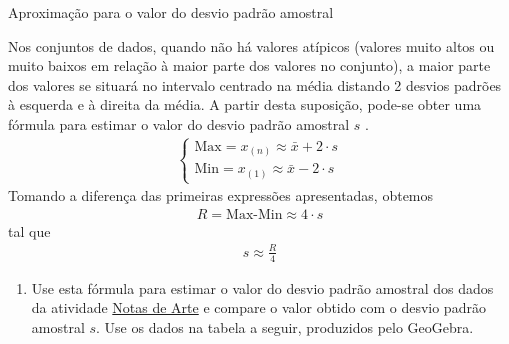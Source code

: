 {\begin{task}{Aproximação para o valor do desvio padrão amostral}
\label{\detokenize{PE104-5:ativ-aproxima-dpa-usando-r}}

Nos conjuntos de dados, quando não há valores atípicos (valores muito altos ou muito baixos em relação à maior parte dos valores no conjunto), a maior parte dos valores se situará no intervalo centrado na média distando 2 desvios padrões à esquerda e à direita da média. A partir desta suposição, pode-se obter uma fórmula para estimar o valor do desvio padrão amostral \(s\) .
\begin{equation*}
\begin{split}\left \{ \begin{array}{l} \text{Max}=x_{(n)}\approx \bar{x}+2\cdot s \\ \text{Min}=x_{(1)}\approx \bar{x}-2\cdot s\end{array}\right.\end{split}
\end{equation*}
Tomando a diferença das primeiras expressões apresentadas, obtemos
\begin{equation*}
\begin{split}R= \text{Max-Min} \approx 4\cdot s\end{split}
\end{equation*}
tal que
\begin{equation*}
\begin{split}s\approx \frac{R}{4}\end{split}
\end{equation*}\begin{enumerate}
\item {} 
Use esta fórmula para estimar o valor do desvio padrão amostral dos dados da atividade \hyperref[\detokenize{PE104-0:ativ-notas-de-artes}]{Notas de Arte} e compare o valor obtido com o desvio padrão amostral \(s\). Use os dados na tabela a seguir, produzidos pelo GeoGebra.

\end{enumerate}


\end{task}}
